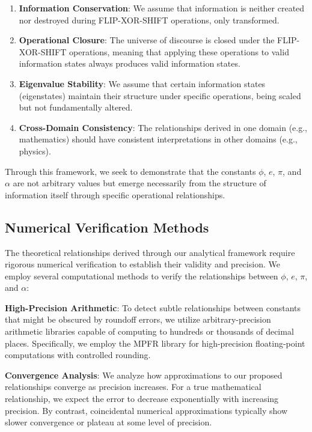 \begin{enumerate}
    \item \textbf{Information Conservation}: We assume that information is neither created nor destroyed during FLIP-XOR-SHIFT operations, only transformed.
    
    \item \textbf{Operational Closure}: The universe of discourse is closed under the FLIP-XOR-SHIFT operations, meaning that applying these operations to valid information states always produces valid information states.
    
    \item \textbf{Eigenvalue Stability}: We assume that certain information states (eigenstates) maintain their structure under specific operations, being scaled but not fundamentally altered.
    
    \item \textbf{Cross-Domain Consistency}: The relationships derived in one domain (e.g., mathematics) should have consistent interpretations in other domains (e.g., physics).
\end{enumerate}

Through this framework, we seek to demonstrate that the constants $\phi$, $e$, $\pi$, and $\alpha$ are not arbitrary values but emerge necessarily from the structure of information itself through specific operational relationships.

\subsection{Numerical Verification Methods}

The theoretical relationships derived through our analytical framework require rigorous numerical verification to establish their validity and precision. We employ several computational methods to verify the relationships between $\phi$, $e$, $\pi$, and $\alpha$:

\textbf{High-Precision Arithmetic}: To detect subtle relationships between constants that might be obscured by roundoff errors, we utilize arbitrary-precision arithmetic libraries capable of computing to hundreds or thousands of decimal places. Specifically, we employ the MPFR library for high-precision floating-point computations with controlled rounding.

\textbf{Convergence Analysis}: We analyze how approximations to our proposed relationships converge as precision increases. For a true mathematical relationship, we expect the error to decrease exponentially with increasing precision. By contrast, coincidental numerical approximations typically show slower convergence or plateau at some level of precision.

